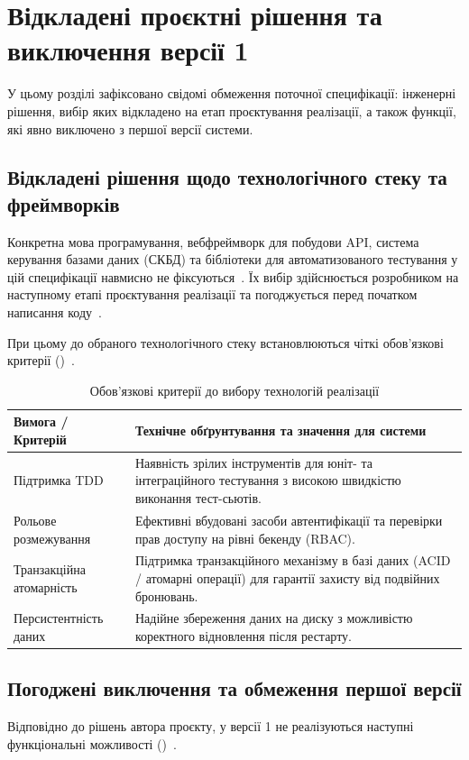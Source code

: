 \section{Відкладені проєктні рішення та виключення версії 1}\label{sec:vidkladeni}

У цьому розділі зафіксовано свідомі обмеження поточної специфікації: інженерні рішення, вибір яких відкладено на етап проєктування реалізації, а також функції, які явно виключено з першої версії системи.

\subsection{Відкладені рішення щодо технологічного стеку та фреймворків}\label{sec:vidkladeni-stek}
Конкретна мова програмування, вебфреймворк для побудови API, система керування базами даних (СКБД) та бібліотеки для автоматизованого тестування у цій специфікації навмисно не фіксуються~. Їх вибір здійснюється розробником на наступному етапі проєктування реалізації та погоджується перед початком написання коду~.

При цьому до обраного технологічного стеку встановлюються чіткі обов'язкові критерії ()~.

\begin{table}[htbp]
\caption{Обов'язкові критерії до вибору технологій реалізації}\label{tab:tech-criteria}
\centering
\begin{tabularx}{\textwidth}{@{}l L@{}}
\toprule
\textbf{Вимога / Критерій} & \textbf{Технічне обґрунтування та значення для системи} \\
\midrule
Підтримка TDD & Наявність зрілих інструментів для юніт- та інтеграційного тестування з високою швидкістю виконання тест-сьютів. \\
Рольове розмежування & Ефективні вбудовані засоби автентифікації та перевірки прав доступу на рівні бекенду (RBAC). \\
Транзакційна атомарність & Підтримка транзакційного механізму в базі даних (ACID / атомарні операції) для гарантії захисту від подвійних бронювань. \\
Персистентність даних & Надійне збереження даних на диску з можливістю коректного відновлення після рестарту. \\
\bottomrule
\end{tabularx}
\end{table}

\subsection{Погоджені виключення та обмеження першої версії}\label{sec:vidkladeni-vykliuchennia}
Відповідно до рішень автора проєкту, у версії 1 не реалізуються наступні функціональні можливості ()~.

